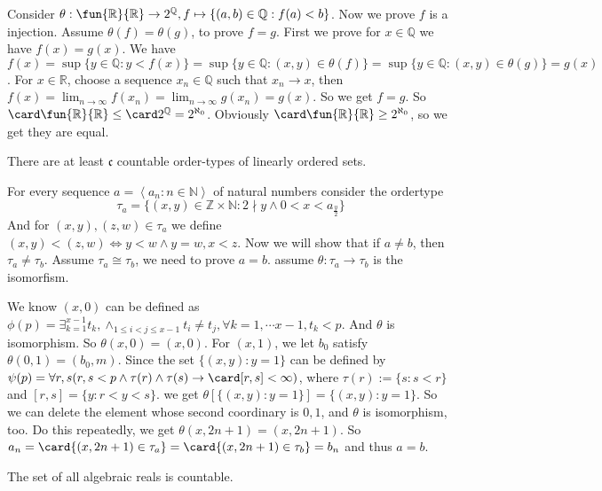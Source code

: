 \documentclass{ctexart}
\begin{document}
\begin{solution}
  Consider \(\theta:\fun{\mathbb{R}}{\mathbb{R}} \to 2^{\mathbb{Q}}, f \mapsto \{(a,b) \in \mathbb{Q}: f(a) < b\}\). 
  Now we prove \(f\) is a injection. 
  Assume \(\theta(f)=\theta(g)\), to prove \(f=g\). 
  First we prove for \(x\in \mathbb{Q}\) we have \(f(x)=g(x)\). 
  We have \(f(x)=\sup \{y \in \mathbb{Q}:y<f(x)\}=\sup\{y \in \mathbb{Q}:(x,y) \in \theta(f)\}=\sup\{y \in \mathbb{Q} : (x,y) \in \theta (g)\}=g(x)\).
  For \(x \in \mathbb{R}\), choose a sequence \(x_n \in \mathbb{Q}\) such that \(x_n \to x\), 
  then \(f(x)= \lim_{n \to \infty }f(x_n)=\lim_{n \to \infty }g(x_n)=g(x)\). 
  So we get \(f=g\). So \(\card \fun{\mathbb{R}}{\mathbb{R}} \leq \card 2^{\mathbb{Q}}=2^{\aleph_0}\).
  Obviously \(\card\fun{\mathbb{R}}{\mathbb{R}} \geq 2^{\aleph_0}\), so we get they are equal. 
\end{solution}
\begin{problem}
There are at least $\mathfrak{c}$ countable order-types of linearly ordered sets.
\end{problem}

\begin{solution}
For every sequence $a=\left\langle a_n: n \in \mathbb{N}\right\rangle$ of natural numbers consider the ordertype
$$
\tau_a=\{(x,y) \in \mathbb{Z}\times \mathbb{N}:2 \nmid y \wedge 0<x<a_{\frac{y}{2}}\}
$$
And for \((x,y),(z,w) \in \tau_a\) we define \((x,y)<(z,w) \iff y<w \wedge y=w,x<z\).
Now we will show that if $a \neq b$, then $\tau_a \neq \tau_b$. 
Assume \(\tau_a \cong \tau_b\), we need to prove \(a=b\). assume \(\theta:\tau_a \to \tau_b\) is the isomorfism. 

We know \((x,0)\) can be defined as \(\phi(p)=\exists_{k=1}^{x-1} t_k,\wedge_{1 \leq i < j \leq x-1}t_i \neq t_j, \forall k=1,\cdots x-1, t_k<p\). 
And \(\theta\) is isomorphism. So \(\theta(x,0)=(x,0)\). 
For \((x,1)\), we let \(b_0\) satisfy \(\theta(0,1)=(b_0,m)\). 
Since the set \(\{(x,y):y=1\}\) can be defined by \(\psi(p)=\forall r,s(r,s<p \wedge \tau(r)\wedge \tau(s) \to \card[r,s] < \infty )\), 
where \(\tau(r):= \{s:s<r\}\) and \([r,s]=\{y:r<y<s\}\). 
we get \(\theta[\{(x,y):y=1\}]=\{(x,y):y=1\}\). 
So we can delete the element whose second coordinary is \(0,1\), and \(\theta\) is isomorphism, too. 
Do this repeatedly, we get \(\theta(x,2n+1)=(x,2n+1)\). 
So \(a_n=\card\{(x,2n+1)\in \tau_a\}=\card \{(x,2n+1) \in \tau_b\}=b_n\) and thus \(a=b\).
\end{solution}
\begin{problem}
The set of all algebraic reals is countable.
\end{problem}
\end{document}
